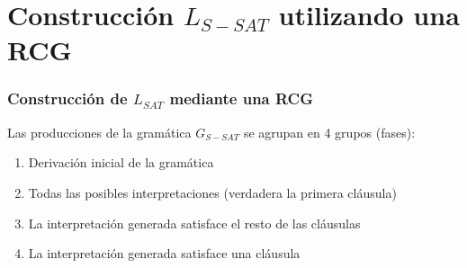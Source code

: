 \documentclass{beamer}
\begin{document}
\section{Construcción $L_{S-SAT}$ utilizando una RCG}




\begin{frame}
    \frametitle{Construcción de $L_{SAT}$ mediante una RCG}

    Las producciones de la gramática $G_{S-SAT}$ se agrupan en 4 grupos (fases):

    \begin{enumerate}
        \item Derivación inicial de la gramática
              \pause
        \item Todas las posibles interpretaciones (verdadera la primera cláusula)
              \pause
        \item La interpretación generada satisface el resto de las cláusulas
              \pause
        \item La interpretación generada satisface una cláusula
    \end{enumerate}

\end{frame}
\end{document}

